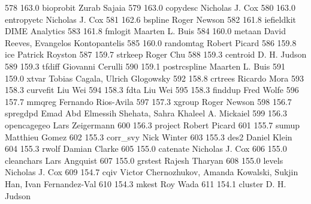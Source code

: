    578    163.0    bioprobit     Zurab Sajaia                            
   579    163.0    copydesc      Nicholas J. Cox                         
   580    163.0    entropyetc    Nicholas J. Cox                         
   581    162.6    bspline       Roger Newson                            
   582    161.8    iefieldkit    DIME Analytics                          
   583    161.8    fmlogit       Maarten L. Buis                         
   584    160.0    metaan        David Reeves, Evangelos Kontopantelis   
   585    160.0    randomtag     Robert Picard                           
   586    159.8    ice           Patrick Royston                         
   587    159.7    strkeep       Roger Chu                               
   588    159.3    centroid      D. H. Judson                            
   589    159.3    tfdiff        Giovanni Cerulli                        
   590    159.1    postrcspline  Maarten L. Buis                         
   591    159.0    xtvar         Tobias Cagala, Ulrich Glogowsky         
   592    158.8    crtrees       Ricardo Mora                            
   593    158.3    curvefit      Liu Wei                                 
   594    158.3    fdta          Liu Wei                                 
   595    158.3    finddup       Fred Wolfe                              
   596    157.7    mmqreg        Fernando Rios-Avila                     
   597    157.3    xgroup        Roger Newson                            
   598    156.7    spregdpd      Emad Abd Elmessih Shehata, Sahra        
                                   Khaleel A. Mickaiel                     
   599    156.3    opencagegeo   Lars Zeigermann                         
   600    156.3    project       Robert Picard                           
   601    155.7    sumup         Matthieu Gomez                          
   602    155.3    corr_svy      Nick Winter                             
   603    155.3    des2          Daniel Klein                            
   604    155.3    rwolf         Damian Clarke                           
   605    155.0    catenate      Nicholas J. Cox                         
   606    155.0    cleanchars    Lars Angquist                           
   607    155.0    grstest       Rajesh Tharyan                          
   608    155.0    levels        Nicholas J. Cox                         
   609    154.7    cqiv          Victor Chernozhukov, Amanda Kowalski,   
                                   Sukjin Han, Ivan Fernandez-Val          
   610    154.3    mkest         Roy Wada                                
   611    154.1    cluster       D. H. Judson                            
